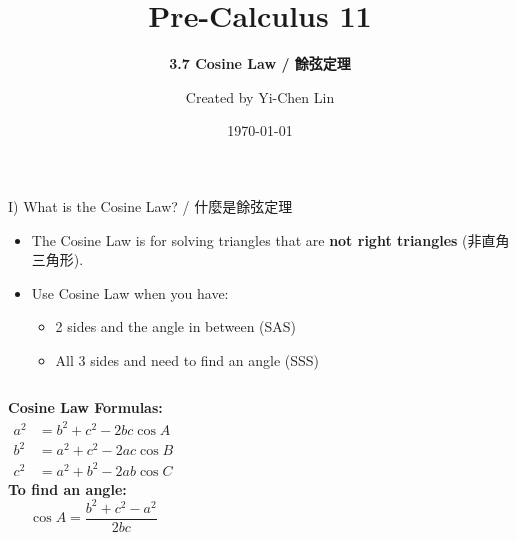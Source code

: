 \documentclass[aspectratio=169]{beamer}
\title{Pre-Calculus 11}
\subtitle{\textbf{3.7 Cosine Law / 餘弦定理}}
\author{Created by Yi-Chen Lin}
\date{\today}
\begin{document}
\begin{frame}
    \titlepage
    \vfill
    \centering
    \footnotesize
\end{frame}

\begin{frame}{I) What is the Cosine Law? / 什麼是餘弦定理}
    \begin{tcolorbox}[colback=lightgray,colframe=primary,title=Cosine Law]
        \footnotesize
        \begin{itemize}
            \item The Cosine Law is for solving triangles that are \textbf{not right triangles} (非直角三角形).
            \item Use Cosine Law when you have:
            \begin{itemize}
                \item 2 sides and the angle in between (SAS)
                \item All 3 sides and need to find an angle (SSS)
            \end{itemize}
        \end{itemize}
    \end{tcolorbox}
    \vspace{0.5em}
    \begin{columns}[T,onlytextwidth]
        \scriptsize
        \textbf{Cosine Law Formulas:}
        \[
            \begin{aligned}
                a^2 &= b^2 + c^2 - 2bc\cos A \\
                b^2 &= a^2 + c^2 - 2ac\cos B \\
                c^2 &= a^2 + b^2 - 2ab\cos C
            \end{aligned}
        \]
        \textbf{To find an angle:}
        \[
            \cos A = \frac{b^2 + c^2 - a^2}{2bc}
        \]
        \centering
        \vspace{-1em}
    \end{columns}
\end{frame}
\end{document}
